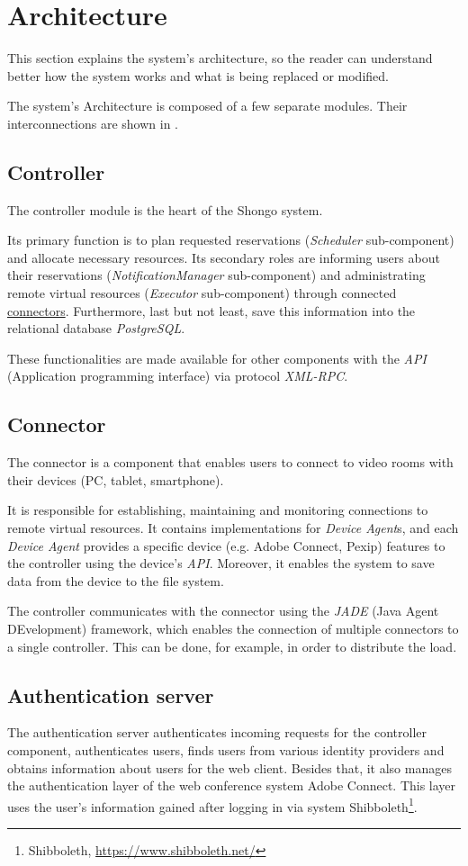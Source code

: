 \section{Architecture}
This section explains the system’s architecture, so the reader can understand better how the system works and what is being replaced or modified.

The system's Architecture is composed of a few separate modules. Their interconnections are shown in .

\subsection{Controller} \label{controller}
The controller module is the heart of the Shongo system.

Its primary function is to plan requested reservations (\emph{Scheduler} sub-component) and allocate necessary resources.
Its secondary roles are informing users about their reservations (\emph{NotificationManager} sub-component) and administrating remote virtual resources (\emph{Executor} sub-component) through connected \hyperref[connector]{connectors}.
Furthermore, last but not least, save this information into the relational database \emph{PostgreSQL}.

These functionalities are made available for other components with the \emph{API} (Application programming interface) via protocol \emph{XML-RPC}.

\subsection{Connector} \label{connector}
The connector is a component that enables users to connect to video rooms with their devices (PC, tablet, smartphone).

It is responsible for establishing, maintaining and monitoring connections to remote virtual resources.
It contains implementations for \emph{Device Agent}s, and each \emph{Device Agent} provides a specific device (e.g. Adobe Connect, Pexip) features to the controller using the device’s \emph{API}.
Moreover, it enables the system to save data from the device to the file system.

The controller communicates with the connector using the \emph{JADE} (Java Agent DEvelopment) framework, which enables the connection of multiple connectors to a single controller. This can be done, for example, in order to distribute the load.

\subsection{Authentication server}
The authentication server authenticates incoming requests for the controller component, authenticates users, finds users from various identity providers and obtains information about users for the web client.
Besides that, it also manages the authentication layer of the web conference system Adobe Connect. This layer uses the user's information gained after logging in via system Shibboleth\footnote{Shibboleth, \url{https://www.shibboleth.net/}}.


